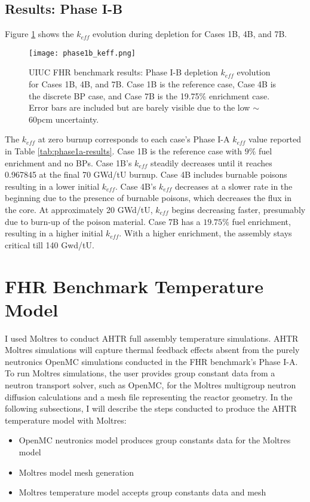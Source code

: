 \subsection{Results: Phase I-B}
\label{sec:fhr-benchmark-results-ib}
Figure \ref{fig:phase1b_keff} shows the $k_{eff}$ evolution during depletion 
for Cases 1B, 4B, and 7B.
\begin{figure}[htbp]
    \centering
    \texttt{[image: phase1b\_keff.png]} 
    \caption{\gls{UIUC} \gls{FHR} benchmark results: Phase I-B depletion 
    $k_{eff}$ evolution for Cases 1B, 4B, and 7B. Case 1B is the reference case, 
    Case 4B is the discrete \acrlong{BP} case, and Case 7B is the 19.75$\%$ 
    enrichment case. Error bars are included but are barely visible due to the 
    low $\sim$60pcm uncertainty.}
    \label{fig:phase1b_keff}
\end{figure}
The $k_{eff}$ at zero burnup corresponds to each case's Phase I-A $k_{eff}$ value 
reported in Table \ref{tab:phase1a-results}. 
Case 1B is the reference case with $9\%$ fuel enrichment and no \glspl{BP}. 
Case 1B's $k_{eff}$ steadily decreases until it reaches 0.967845 at the final 70 
GWd/tU burnup. 
Case 4B includes burnable poisons resulting in a lower initial $k_{eff}$. 
Case 4B's $k_{eff}$ decreases at a slower rate in the beginning due to the presence of 
burnable poisons, which decreases the flux in the core. 
At approximately 20 GWd/tU, $k_{eff}$ begins decreasing faster, presumably
due to burn-up of the poison material.   
Case 7B has a $19.75\%$ fuel enrichment, resulting in a higher initial $k_{eff}$. 
With a higher enrichment, the assembly stays critical till 140 Gwd/tU. 

\section{FHR Benchmark Temperature Model}
\label{sec:fhr-bm-multiphysics}
I used Moltres \cite{lindsay_moltres_2017} to conduct \gls{AHTR} full assembly temperature 
simulations. 
AHTR Moltres simulations will capture thermal feedback effects absent from the purely 
neutronics OpenMC simulations conducted in the \gls{FHR} benchmark's Phase I-A.
To run Moltres simulations, the user provides group constant data from a neutron transport 
solver, such as OpenMC, for the Moltres multigroup neutron diffusion calculations and
a mesh file representing the reactor geometry. 
In the following subsections, I will describe the steps conducted to produce the 
\gls{AHTR} temperature model with Moltres:
\begin{itemize}
    \item OpenMC neutronics model produces group constants data for the Moltres model
    \item Moltres model mesh generation
    \item Moltres temperature model accepts group constants data and mesh
\end{itemize}

